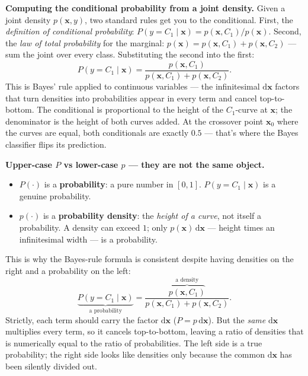 \documentclass[11pt, a4paper]{article}
\begin{document}
\textbf{Computing the conditional probability from a joint density.} Given a joint density $p(\mathbf{x}, y)$, two standard rules get you to the conditional. First, the \emph{definition of conditional probability}: $P(y = C_1 \mid \mathbf{x}) = p(\mathbf{x}, C_1) / p(\mathbf{x})$. Second, the \emph{law of total probability} for the marginal: $p(\mathbf{x}) = p(\mathbf{x}, C_1) + p(\mathbf{x}, C_2)$ — sum the joint over every class. Substituting the second into the first:
\[
P(y = C_1 \mid \mathbf{x}) = \frac{p(\mathbf{x}, C_1)}{p(\mathbf{x}, C_1) + p(\mathbf{x}, C_2)}.
\]
This is Bayes' rule applied to continuous variables — the infinitesimal $\mathrm{d}\mathbf{x}$ factors that turn densities into probabilities appear in every term and cancel top-to-bottom. The conditional is proportional to the height of the $C_1$-curve at $\mathbf{x}$; the denominator is the height of both curves added. At the crossover point $\mathbf{x}_0$ where the curves are equal, both conditionals are exactly $0.5$ — that's where the Bayes classifier flips its prediction.

\begin{notebox}
\textbf{Upper-case $P$ vs lower-case $p$ — they are not the same object.}
\begin{itemize}
  \item $P(\cdot)$ is a \textbf{probability}: a pure number in $[0,1]$. $P(y = C_1 \mid \mathbf{x})$ is a genuine probability.
  \item $p(\cdot)$ is a \textbf{probability density}: the \emph{height of a curve}, not itself a probability. A density can exceed $1$; only $p(\mathbf{x})\,\mathrm{d}\mathbf{x}$ — height times an infinitesimal width — is a probability.
\end{itemize}
This is why the Bayes-rule formula is consistent despite having densities on the right and a probability on the left:
\[
\underbrace{P(y = C_1 \mid \mathbf{x})}_{\text{a probability}} = \frac{\overbrace{p(\mathbf{x}, C_1)}^{\text{a density}}}{p(\mathbf{x}, C_1) + p(\mathbf{x}, C_2)}.
\]
Strictly, each term should carry the factor $\mathrm{d}\mathbf{x}$ ($P = p\,\mathrm{d}\mathbf{x}$). But the \emph{same} $\mathrm{d}\mathbf{x}$ multiplies every term, so it cancels top-to-bottom, leaving a ratio of densities that is numerically equal to the ratio of probabilities. The left side is a true probability; the right side looks like densities only because the common $\mathrm{d}\mathbf{x}$ has been silently divided out.
\end{notebox}
\end{document}
